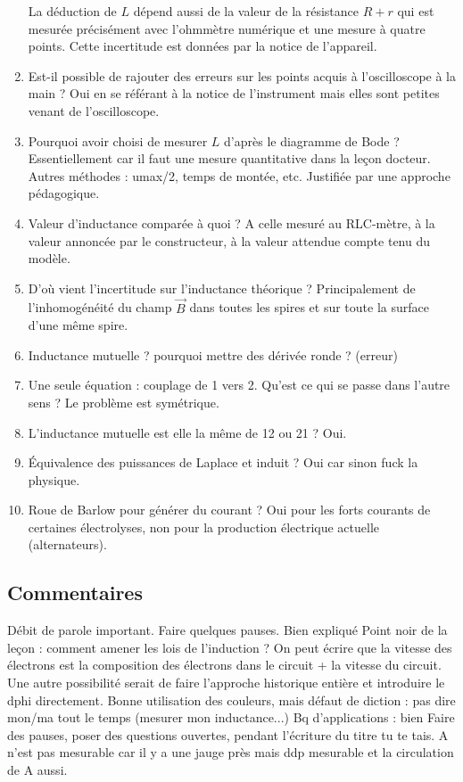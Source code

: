 \begin{enumerate}
La déduction de $L$ dépend aussi de la valeur de la résistance $R + r$ qui est mesurée précisément avec l'ohmmètre numérique et une mesure à quatre points.
Cette incertitude est données par la notice de l'appareil.
\item Est-il possible de rajouter des erreurs sur les points acquis à l'oscilloscope à la main ?
Oui en se référant à la notice de l'instrument mais elles sont petites venant de l'oscilloscope.
\item Pourquoi avoir choisi de mesurer $L$ d'après le diagramme de Bode ?
Essentiellement car il faut une mesure quantitative dans la leçon docteur.
Autres méthodes : umax/2, temps de montée, etc.
Justifiée par une approche pédagogique.
\item Valeur d'inductance comparée à quoi ? A celle mesuré au RLC-mètre, à la valeur annoncée par le constructeur, à la valeur attendue compte tenu du modèle.
\item D'où vient l'incertitude sur l'inductance théorique ? Principalement de l'inhomogénéité du champ $\overrightarrow{B}$ dans toutes les spires et sur toute la surface d'une même spire.
\item Inductance mutuelle ? pourquoi mettre des dérivée ronde ? (erreur)
\item Une seule équation : couplage de 1 vers 2. Qu'est ce qui se passe dans l'autre sens ?
Le problème est symétrique.
\item L'inductance mutuelle est elle la même de 12 ou 21 ? Oui.
\item Équivalence des puissances de Laplace et induit ? Oui car sinon fuck la physique.
\item Roue de Barlow pour générer du courant ? Oui pour les forts courants de certaines électrolyses, non pour la production électrique actuelle (alternateurs).
\end{enumerate}

\subsection*{Commentaires}

Débit de parole important. Faire quelques pauses.
Bien expliqué
Point noir de la leçon : comment amener les lois de l'induction ?
On peut écrire que la vitesse des électrons est la composition des électrons dans le circuit + la vitesse du circuit.
Une autre possibilité serait de faire l'approche historique entière et introduire le dphi directement.
Bonne utilisation des couleurs, mais défaut de diction : pas dire mon/ma tout le temps (mesurer mon inductance...)
Bq d'applications : bien
Faire des pauses, poser des questions ouvertes, pendant l'écriture du titre tu te tais.
A n'est pas mesurable car il y a une jauge près mais ddp mesurable et la circulation de A aussi.
\newpage